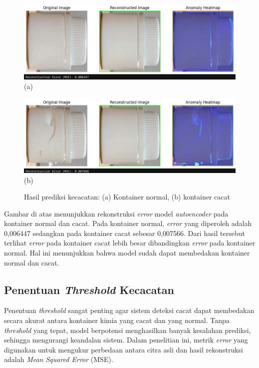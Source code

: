 \begin{figure}[H]
  \centering
  \begin{minipage}{\textwidth}
    \centering
    \includegraphics[width=\textwidth]{gambar/kontainer_bagus.jpeg}
    (a)
  \end{minipage}
  \vspace{1em}

  \begin{minipage}{\textwidth}
    \centering
    \includegraphics[width=\textwidth]{gambar/kontainer_cacat.jpeg}
    (b)
  \end{minipage}
  \caption{Hasil prediksi kecacatan: (a) Kontainer normal, (b)
  kontainer cacat}
  \label{fig:autoencoder-test}
  \vspace{-1em}
\end{figure}

Gambar di atas menunjukkan rekonstruksi \textit{error} model
\textit{autoencoder} pada kontainer normal dan cacat. Pada kontainer
normal, \textit{error} yang diperoleh adalah 0,006447 sedangkan pada
kontainer cacat sebesar 0,007566. Dari hasil tersebut terlihat
\textit{error} pada kontainer cacat lebih besar dibandingkan
\textit{error} pada kontainer normal. Hal ini menunjukkan bahwa model
sudah dapat membedakan kontainer normal dan cacat.

\vspace{1em}

\subsection{Penentuan \textit{Threshold} Kecacatan}
Penentuan \textit{threshold} sangat penting agar sistem deteksi cacat dapat
membedakan secara akurat antara kontainer kimia yang cacat dan yang
normal. Tanpa \textit{threshold} yang tepat, model berpotensi menghasilkan
banyak kesalahan prediksi, sehingga mengurangi keandalan sistem.
Dalam penelitian
ini, metrik \textit{error} yang digunakan untuk mengukur perbedaan antara
citra asli dan hasil rekonstruksi adalah \textit{Mean Squared Error} (MSE).

